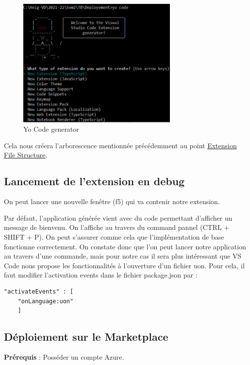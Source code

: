 \documentclass[
    iict, %
    il, %
]{heig-tb}
\begin{document}
\begin{figure}[!h]
    \begin{center}
        \includegraphics[width=8cm]{assets/figures/yo-code.png}
    \end{center}
    \caption[Yo Code generator]{\label{yo-code}Yo Code generator}
\end{figure}

Cela nous créera l'arborescence mentionnée précédemment au point \hyperref[Extension File Structure]{Extension File Structure}.

\subsection{Lancement de l'extension en debug}
On peut lancer une nouvelle fenêtre (f5) qui va contenir notre extension.

Par défaut, l'application générée vient avec du code permettant d'afficher un message de bienvenu. On l'affiche au travers du command pannel (CTRL + SHIFT + P). On peut s'assurer comme cela que l'implémentation de base fonctionne correctement.
On constate donc que l'on peut lancer notre application au travers d'une commande, mais pour notre cas il sera plus intéressant que VS Code nous propose les fonctionnalités à l'ouverture d'un fichier uon.
Pour cela, il faut modifier l'activation events dans le fichier package.json par :
\begin{lstlisting}[frame=single]
    "activateEvents" : [
	"onLanguage:uon"
    ]
\end{lstlisting}

\subsection{Déploiement sur le Marketplace}

\textbf{Prérequis} : Posséder un compte Azure.
\end{document}
